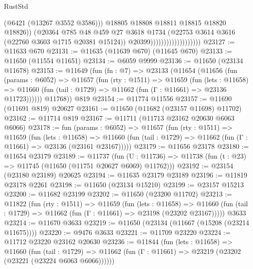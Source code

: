 \begin{lexlean}{RustStd}
\begin{coremodule}
                                              (@6421 (@13267 @3552 @3586)))
                                            @18805
                                            @18808
                                            @18811
                                            @18815
                                            @18820
                                            @18826))
                                        (@20364
                                          @785
                                          @48
                                          @459
                                          @27
                                          @3618
                                          @1734
                                          (@22753 @3614 @3616 (@22760 @3603 @1715 @20381 @15124))
                                          @20399)))))))))))))))))))
@23127 := @11633 @670
@23131 := @11635 (@11639 @670) (@11645 @670)
@23133 := @11650 (@11554 @11651)
@23134 := @6059 @9999
@23136 := @11650 (@23134 @11678)
@23153 := @11649
    (fun (fn : @7) =>
    @23133
      (@11654
        (@11656
          (fun (params : @6052) =>
          @11657
            (fun (rty : @1511) =>
            @11659
              (fun (lets : @11658) =>
              @11660 (fun (tail : @1729) => @11662 (fun (Γ : @11661) => @23136 @11723))))))
        @11768))
    @819
@23154 := @11774 @11556
@23157 := @11690 (@11691 @819) @20627
@23161 := @11650 (@11682 (@23157 @11698) @11702)
@23162 := @11714 @819
@23167 := @11711 (@11713 @23162 @20630 @6063 @6066)
@23178 := fun (params : @6052) =>
  @11657
    (fun (rty : @1511) =>
    @11659
      (fun (lets : @11658) =>
      @11660 (fun (tail : @1729) => @11662 (fun (Γ : @11661) => @23136 (@23161 @23167)))))
@23179 := @11656 @23178
@23180 := @11654 @23179
@23189 := @11737
    (fun (U : @11736) => @11738 (fun (t : @23) => @11745 (@11650 (@11751 @20627 @6069) @11762)))
@23192 := @23154 (@23180 @23189) @20625
@23194 := @11635 @23179 @23189
@23196 := @11819 @23178 @2261
@23198 := @11650 (@23134 @15210)
@23199 := @23157 @15213
@23200 := @11682 @23199
@23202 := @11650 (@23200 @11702)
@23213 := @11822
    (fun (rty : @1511) =>
    @11659
      (fun (lets : @11658) =>
      @11660 (fun (tail : @1729) => @11662 (fun (Γ : @11661) => @23198 (@23202 @23167)))))
    @3633
@23214 := @11670 @3633
@23219 := @11650 (@23134 (@11667 (@15208 (@23214 @11675))))
@23220 := @9476 @3633
@23221 := @11709 @23220
@23224 := @11712 @23220 @23162 @20630
@23236 := @11844
    (fun (lets : @11658) =>
    @11660
      (fun (tail : @1729) =>
      @11662 (fun (Γ : @11661) => @23219 (@23202 (@23221 (@23224 @6063 @6066))))))

\end{coremodule}
\end{lexlean}
